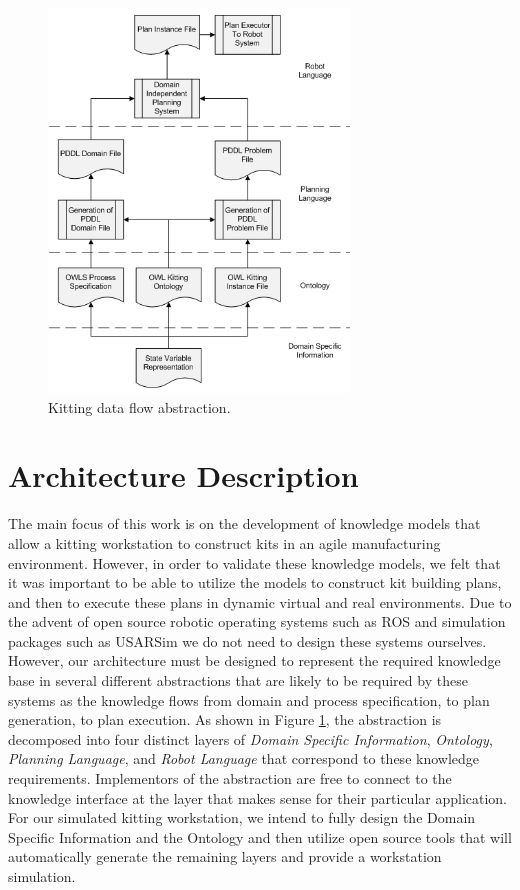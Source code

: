 \documentclass[a4paper, 10pt, conference]{ieeeconf}      %
\begin{document}
\begin{figure}[htb]
\includegraphics[width=8cm]{images/ProcessDataFlowV2.jpg}
\caption{Kitting data flow abstraction.}
\label{fig:ProcessDataFlow}
\end{figure}

\section{Architecture Description}
\label{sect:Architecture}
The main focus of this work is on the development of knowledge models that allow a kitting workstation to construct kits
in an agile manufacturing environment. However, in order to validate these knowledge models, we felt that it was
important to be able to utilize the models to construct kit building plans, and then to execute these plans in dynamic
virtual and real environments. Due to the advent of open source robotic operating systems such as ROS \cite{ROS} and simulation
packages such as USARSim \cite{Balakirsky2007} we do not need to design these systems ourselves. However, our architecture must
be designed to represent the required knowledge base in several different abstractions that are likely to be
required by these systems as the knowledge flows from domain and process specification, to plan generation, to plan execution.
As shown in Figure \ref{fig:ProcessDataFlow}, the abstraction is decomposed into four
distinct layers of {\it Domain Specific Information}, {\it Ontology}, {\it Planning Language}, and {\it Robot Language} that correspond to these
knowledge requirements. Implementors of the abstraction are free to connect to the knowledge interface at the layer that makes sense for
their particular application. For our simulated kitting workstation, we intend to fully design the Domain Specific Information and the Ontology and
then utilize open
source tools that will automatically generate the remaining layers and provide a workstation simulation.
\end{document}
